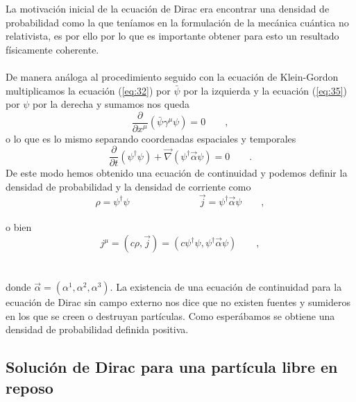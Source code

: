 \documentclass[11pt,letterpaper]{article}     %
\begin{document}
La motivación inicial de la ecuación de Dirac era encontrar una densidad de probabilidad como la que teníamos en la formulación de la mecánica cuántica no relativista, es por ello por lo que es importante obtener para esto un resultado físicamente coherente. \\ \\
De manera análoga al procedimiento seguido con la ecuación de Klein-Gordon multiplicamos la ecuación (\ref{eq:32}) por $\bar{\psi}$ por la izquierda y la ecuación (\ref{eq:35}) por $\psi$ por la derecha y sumamos nos queda
\begin{equation} \label{eq:40}
\frac{\partial}{\partial x^\mu} \left( \bar{\psi}\gamma^\mu \psi \right)=0 \qquad ,
\end{equation}
o lo que es lo mismo separando coordenadas espaciales y temporales
\begin{equation} \label{eq:41}
\frac{\partial}{\partial t} (\psi^\dagger \psi)+ \vec{\nabla}(\psi^\dagger\vec{\alpha}\psi) = 0 \qquad .
\end{equation}
De este modo hemos obtenido una ecuación de continuidad y podemos definir la densidad de probabilidad y la densidad de corriente como
\begin{equation} \label{eq:42}
\rho=\psi^\dagger \psi \hspace{3cm} \vec{j}=\psi^\dagger \vec{\alpha} \psi \qquad ,
\end{equation} \\ 
o bien
\begin{equation} \label{eq:43}
j^\mu = (c \rho, \vec{j}) = (c \psi^\dagger \psi, \psi^\dagger \vec{\alpha} \psi) \qquad ,
\end{equation} \\ \\
donde $\vec{\alpha}=(\alpha^1 , \alpha^2 , \alpha^3)$. La existencia de una ecuación de continuidad para la ecuación de Dirac sin campo externo nos dice que no existen fuentes y sumideros en los que se creen o destruyan partículas. Como esperábamos se obtiene una densidad de probabilidad definida positiva. \\





\subsection{Solución de Dirac para una partícula libre en reposo}
\end{document}
